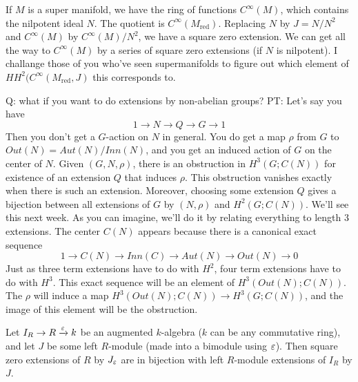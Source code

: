 \begin{remark}
 If $M$ is a super manifold, we have the ring of functions $C^\infty(M)$, which contains the nilpotent ideal $N$. The quotient is $C^\infty(M_\text{red})$. Replacing $N$ by $J=N/N^2$ and $C^\infty(M)$ by $C^\infty(M)/N^2$, we have a square zero extension. We can get all the way to $C^\infty(M)$ by a series of square zero extensions (if $N$ is nilpotent). I challange those of you who've seen supermanifolds to figure out which element of $HH^2(C^\infty(M_\text{red},J)$ this corresponds to.
\end{remark}
\begin{remark}
 Q: what if you want to do extensions by non-abelian groups? PT: Let's say you have
 \[
  1\to N\to Q\to G\to 1
 \]
 Then you don't get a $G$-action on $N$ in general. You do get a map $\rho$ from $G$ to $Out(N)=Aut(N)/Inn(N)$, and you get an induced action of $G$ on the center of $N$. Given $(G,N,\rho)$, there is an obstruction in $H^3(G;C(N))$ for existence of an extension $Q$ that induces $\rho$. This obstruction vanishes exactly when there is such an extension. Moreover, choosing some extension $Q$ gives a bijection between all extensions of $G$ by $(N,\rho)$ and $H^2(G;C(N))$. We'll see this next week. As you can imagine, we'll do it by relating everything to length 3 extensions. The center $C(N)$ appears because there is a canonical exact sequence
 \[
  1\to C(N)\to Inn(C)\to Aut(N)\to Out(N)\to 0
 \]
 Just as three term extensions have to do with $H^2$, four term extensions have to do with $H^3$. This exact sequence will be an element of $H^3(Out(N);C(N))$. The $\rho$ will induce a map $H^3(Out(N);C(N))\to  H^3(G;C(N))$, and the image of this element will be the obstruction.
\end{remark}
\begin{theorem}[Theorem 2]
 Let $I_R\to R\xrightarrow{\varepsilon} k$ be an augmented $k$-algebra ($k$ can be any commutative ring), and let $J$ be some left $R$-module (made into a bimodule using $\varepsilon$). Then square zero extensions of $R$ by $J_\varepsilon$ are in bijection with left $R$-module extensions of $I_R$ by $J$.
\end{theorem}
